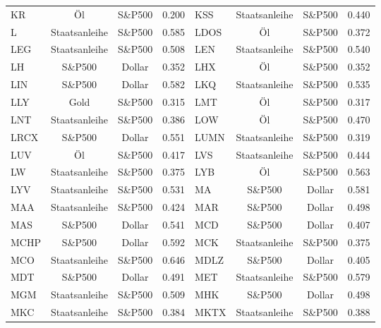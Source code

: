 \begin{longtable}{l c c c | l c c c}
    KR     & Öl            & S\&P500   & 0.200         & KSS    & Staatsanleihe & S\&P500   & 0.440         \\
    L      & Staatsanleihe & S\&P500   & 0.585         & LDOS   & Öl            & S\&P500   & 0.372         \\
    LEG    & Staatsanleihe & S\&P500   & 0.508         & LEN    & Staatsanleihe & S\&P500   & 0.540         \\
    LH     & S\&P500       & Dollar    & 0.352         & LHX    & Öl            & S\&P500   & 0.352         \\
    LIN    & S\&P500       & Dollar    & 0.582         & LKQ    & Staatsanleihe & S\&P500   & 0.535         \\
    LLY    & Gold          & S\&P500   & 0.315         & LMT    & Öl            & S\&P500   & 0.317         \\
    LNT    & Staatsanleihe & S\&P500   & 0.386         & LOW    & Öl            & S\&P500   & 0.470         \\
    LRCX   & S\&P500       & Dollar    & 0.551         & LUMN   & Staatsanleihe & S\&P500   & 0.319         \\
    LUV    & Öl            & S\&P500   & 0.417         & LVS    & Staatsanleihe & S\&P500   & 0.444         \\
    LW     & Staatsanleihe & S\&P500   & 0.375         & LYB    & Öl            & S\&P500   & 0.563         \\
    LYV    & Staatsanleihe & S\&P500   & 0.531         & MA     & S\&P500       & Dollar    & 0.581         \\
    MAA    & Staatsanleihe & S\&P500   & 0.424         & MAR    & S\&P500       & Dollar    & 0.498         \\
    MAS    & S\&P500       & Dollar    & 0.541         & MCD    & S\&P500       & Dollar    & 0.407         \\
    MCHP   & S\&P500       & Dollar    & 0.592         & MCK    & Staatsanleihe & S\&P500   & 0.375         \\
    MCO    & Staatsanleihe & S\&P500   & 0.646         & MDLZ   & S\&P500       & Dollar    & 0.405         \\
    MDT    & S\&P500       & Dollar    & 0.491         & MET    & Staatsanleihe & S\&P500   & 0.579         \\
    MGM    & Staatsanleihe & S\&P500   & 0.509         & MHK    & S\&P500       & Dollar    & 0.498         \\
    MKC    & Staatsanleihe & S\&P500   & 0.384         & MKTX   & Staatsanleihe & S\&P500   & 0.388         \\

\end{longtable}
